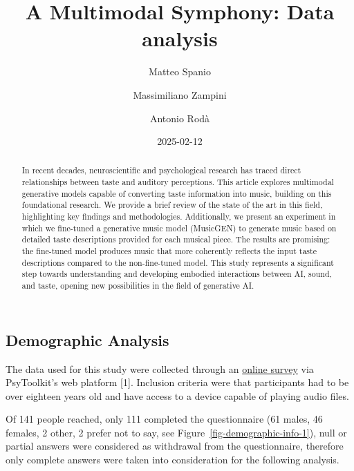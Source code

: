 \documentclass[
  letterpaper,
  DIV=11,
  numbers=noendperiod]{scrartcl}
\title{A Multimodal Symphony: Data analysis}
\author{Matteo Spanio \and Massimiliano Zampini \and Antonio Rodà}
\date{2025-02-12}
\begin{document}
\maketitle
\begin{abstract}
In recent decades, neuroscientific and psychological research has traced
direct relationships between taste and auditory perceptions. This
article explores multimodal generative models capable of converting
taste information into music, building on this foundational research. We
provide a brief review of the state of the art in this field,
highlighting key findings and methodologies. Additionally, we present an
experiment in which we fine-tuned a generative music model (MusicGEN) to
generate music based on detailed taste descriptions provided for each
musical piece. The results are promising: the fine-tuned model produces
music that more coherently reflects the input taste descriptions
compared to the non-fine-tuned model. This study represents a
significant step towards understanding and developing embodied
interactions between AI, sound, and taste, opening new possibilities in
the field of generative AI.
\end{abstract}


\subsection{Demographic Analysis}\label{demographic-analysis}

The data used for this study were collected through an
\href{https://www.psytoolkit.org/c/3.4.6/survey?s=YmxcY}{online survey}
via PsyToolkit's web platform {[}1{]}. Inclusion criteria were that
participants had to be over eighteen years old and have access to a
device capable of playing audio files.

Of 141 people reached, only 111 completed the questionnaire (61 males,
46 females, 2 other, 2 prefer not to say, see
Figure~\ref{fig-demographic-info-1}), null or partial answers were
considered as withdrawal from the questionnaire, therefore only complete
answers were taken into consideration for the following analysis.
\end{document}
